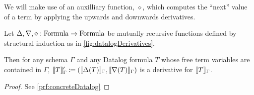 \newcommand{\bothdiff}{\diamond}

We will make use of an auxilliary function, $\bothdiff$, which computes the
``next'' value of a term by applying the upwards and downwards derivatives.

\newcommand{\bothchanges}{\rho}
\begin{thm}[name=Concrete Datalog formula derivatives, restate=concreteDatalog]
\label{thm:concreteDatalog}
  Let $\updiff, \downdiff, \bothdiff : \Formula \rightarrow \Formula$ be mutually recursive functions
  defined by structural induction as in \cref{fig:datalogDerivatives}.

  Then for any schema $\Gamma$ and any Datalog formula $T$ whose free term variables are contained
  in $\Gamma$,
  $\llbracket T \rrbracket_\Gamma' \coloneqq (\llbracket \Delta(T) \rrbracket_\Gamma, \llbracket \nabla(T) \rrbracket_\Gamma)$
  is a derivative for $\llbracket T \rrbracket_\Gamma$.
\end{thm}
\ifproofs
\begin{proof}
  See \cref{prf:concreteDatalog}
\end{proof}
\fi

